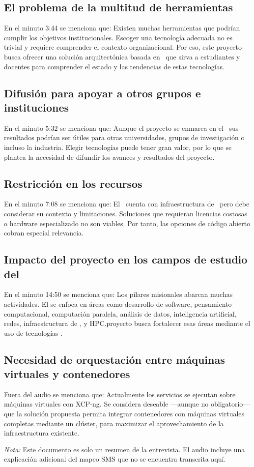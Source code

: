 \subsection{El problema de la multitud de herramientas}
En el minuto 3:44 se menciona que: Existen muchas herramientas que podrían cumplir los objetivos institucionales. Escoger una tecnología adecuada no es trivial y requiere comprender el contexto organizacional. Por eso, este proyecto busca ofrecer una solución arquitectónica basada en \VBC\, que sirva a estudiantes y docentes para comprender el estado y las tendencias de estas tecnologías.

\subsection{Difusión para apoyar a otros grupos e instituciones}
En el minuto 5:32 se menciona que: Aunque el proyecto se enmarca en el \GRID\, sus resultados podrían ser útiles para otras universidades, grupos de investigación o incluso la industria. Elegir tecnologías \VBC{} puede tener gran valor, por lo que se plantea la necesidad de difundir los avances y resultados del proyecto.

\subsection{Restricción en los recursos}
En el minuto 7:08 se menciona que: El \GRID\ cuenta con infraestructura de \TI\, pero debe considerar su contexto y limitaciones. Soluciones que requieran licencias costosas o hardware especializado no son viables. Por tanto, las opciones de código abierto cobran especial relevancia.

\subsection{Impacto del proyecto en los campos de estudio del \GRID}
En el minuto 14:50 se menciona que: Los pilares misionales abarcan muchas actividades. El \GRID se enfoca en áreas como desarrollo de software, pensamiento computacional, computación paralela, análisis de datos, inteligencia artificial, redes, infraestructura de \TI, y HPC.\@Este proyecto busca fortalecer esas áreas mediante el uso de tecnologías \VBC.\@

\subsection{Necesidad de orquestación entre máquinas virtuales y contenedores}
Fuera del audio se menciona que: Actualmente los servicios se ejecutan sobre máquinas virtuales con XCP-ng. Se considera deseable —aunque no obligatorio— que la solución propuesta permita integrar contenedores con máquinas virtuales completas mediante un clúster, para maximizar el aprovechamiento de la infraestructura existente.

\bigskip\noindent \textit{Nota:} Este documento es solo un resumen de la entrevista. El audio incluye una explicación adicional del mapeo SMS que no se encuentra transcrita aquí.